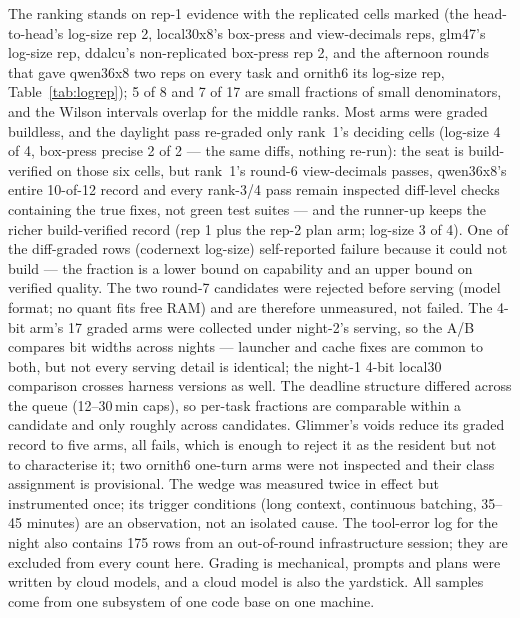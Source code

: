 The ranking stands on rep-1 evidence with the replicated cells marked (the head-to-head's log-size rep 2,
local30x8's box-press and view-decimals reps, glm47's log-size rep, ddalcu's non-replicated box-press rep 2,
and the afternoon rounds that gave qwen36x8 two reps on every task and ornith6 its log-size rep,
Table~\ref{tab:logrep}); 5 of 8 and
7 of 17 are small fractions of small denominators, and the Wilson intervals overlap for the middle ranks. Most
arms were graded buildless, and the daylight pass re-graded only rank~1's deciding cells (log-size 4 of 4,
box-press precise 2 of 2 --- the same diffs, nothing re-run): the seat is build-verified on those six cells,
but rank~1's round-6 view-decimals passes, qwen36x8's entire 10-of-12 record and every rank-3/4 pass remain
inspected diff-level checks
containing the true fixes, not green test suites --- and the runner-up keeps the richer build-verified record
(rep 1 plus the rep-2 plan arm; log-size 3 of 4). One of the diff-graded rows (codernext
log-size) self-reported failure because it could not build --- the fraction is a lower bound on capability and an
upper bound on verified quality. The two round-7 candidates were rejected before serving (model format; no
quant fits free RAM) and are therefore unmeasured, not failed. The 4-bit arm's 17 graded arms were collected under night-2's serving, so the
A/B compares bit widths across nights --- launcher and cache fixes are common to both, but not every serving
detail is identical; the night-1 4-bit local30 comparison crosses harness versions as well. The deadline
structure differed across the queue (12--30\,min caps), so per-task fractions are comparable within a candidate
and only roughly across candidates. Glimmer's voids reduce its graded record to five arms, all fails, which is
enough to reject it as the resident but not to characterise it; two ornith6 one-turn arms were not inspected and
their class assignment is provisional. The wedge was measured twice in effect but instrumented once; its trigger
conditions (long context, continuous batching, 35--45 minutes) are an observation, not an isolated cause. The
tool-error log for the night also contains 175 rows from an out-of-round infrastructure session; they are
excluded from every count here. Grading is mechanical, prompts and plans were written by cloud models, and a
cloud model is also the yardstick. All samples come from one subsystem of one code base on one machine.

\clearpage
{}
{}
\printbibliography[title={References}]


